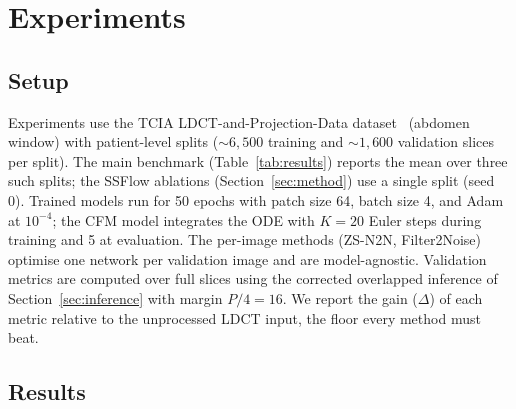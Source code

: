 \documentclass[letterpaper]{article} %
\begin{document}
\section{Experiments}

\subsection{Setup}

Experiments use the TCIA LDCT-and-Projection-Data dataset~\cite{moen2021low}
(abdomen window) with patient-level splits ($\sim$$6{,}500$ training and
$\sim$$1{,}600$ validation slices per split).  The main benchmark
(Table~\ref{tab:results}) reports the mean over three such splits; the SSFlow
ablations (Section~\ref{sec:method}) use a single split (seed 0).  Trained models
run for 50 epochs with patch size 64, batch size 4, and Adam at $10^{-4}$; the
CFM model integrates the ODE with $K=20$ Euler steps during training and 5 at
evaluation.  The per-image methods (ZS-N2N, Filter2Noise) optimise one
network per validation image and are model-agnostic.  Validation metrics
are computed over full slices using the corrected overlapped inference of
Section~\ref{sec:inference} with margin $P/4 = 16$.  We report the gain
($\Delta$) of each metric relative to the unprocessed LDCT input,
the floor every method must beat.

\subsection{Results}
\label{sec:results}
\end{document}
